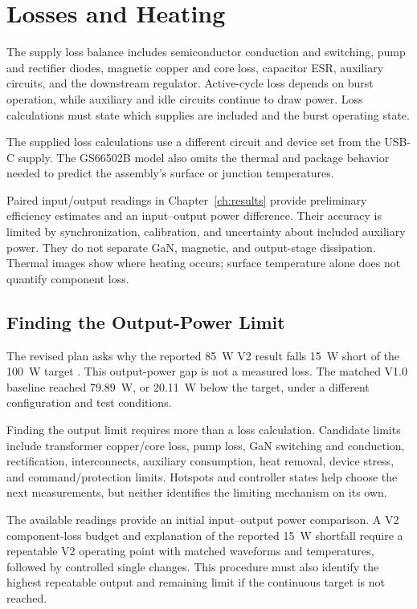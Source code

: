 \section{Losses and Heating}
\label{sec:sim-loss}

The supply loss balance includes semiconductor conduction and switching, pump and rectifier diodes, magnetic copper and core loss, capacitor ESR, auxiliary circuits, and the downstream regulator. Active-cycle loss depends on burst operation, while auxiliary and idle circuits continue to draw power. Loss calculations must state which supplies are included and the burst operating state.

The supplied loss calculations use a different circuit and device set from the USB-C supply. The GS66502B model also omits the thermal and package behavior needed to predict the assembly's surface or junction temperatures.

Paired input/output readings in Chapter~\ref{ch:results} provide preliminary efficiency estimates and an input--output power difference. Their accuracy is limited by synchronization, calibration, and uncertainty about included auxiliary power. They do not separate GaN, magnetic, and output-stage dissipation. Thermal images show where heating occurs; surface temperature alone does not quantify component loss.

\subsection{Finding the Output-Power Limit}
\label{sec:sim-power-gap}

The revised plan asks why the reported \SI{85}{\watt} V2 result falls \SI{15}{\watt} short of the \SI{100}{\watt} target \cite{projectOctoberPlan}. This output-power gap is not a measured loss. The matched V1.0 baseline reached \SI{79.89}{\watt}, or \SI{20.11}{\watt} below the target, under a different configuration and test conditions.

Finding the output limit requires more than a loss calculation. Candidate limits include transformer copper/core loss, pump loss, GaN switching and conduction, rectification, interconnects, auxiliary consumption, heat removal, device stress, and command/protection limits. Hotspots and controller states help choose the next measurements, but neither identifies the limiting mechanism on its own.

The available readings provide an initial input--output power comparison. A V2 component-loss budget and explanation of the reported \SI{15}{\watt} shortfall require a repeatable V2 operating point with matched waveforms and temperatures, followed by controlled single changes. This procedure must also identify the highest repeatable output and remaining limit if the continuous target is not reached.
